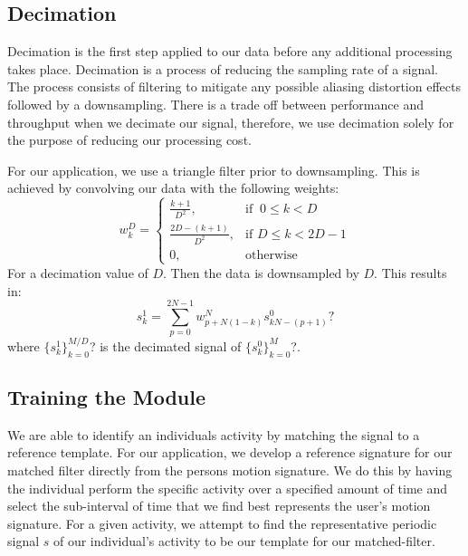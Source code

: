 \documentclass[journal]{IEEEtran}
\begin{document}
\subsection{Decimation}
Decimation is the first step applied to our data before any additional processing takes place.
Decimation is a process of reducing the sampling rate of a signal.
The process consists of filtering to mitigate any possible aliasing distortion effects followed by a downsampling.
There is a trade off between performance and throughput when we decimate our signal, therefore, we use decimation solely for the purpose of reducing our processing cost.

For our application, we use a triangle filter prior to downsampling. This is achieved by convolving our data with the following weights:
%
\begin{equation} \label{triangle_filter_weights}
w_k^D =
\begin{cases}
  \frac{k+1}{D^2}, & \text{if }\ 0 \leq k < D \\
  \frac{2D - (k + 1)}{D^2}, & \text{if } D \leq k < 2D - 1 \\
  0, & \text{otherwise}
\end{cases}
\end{equation}
%
For a decimation value of $D$. Then the data is downsampled by $D$. This results in:
%
\begin{equation} \label{decimated_signal}
s_k^1 = \sum_{p=0}^{2N-1} w_{p+N(1-k)}^N s_{kN - (p+1)}^0 ?
\end{equation}
%
where $\{s_k^1\}_{k=0}^{M/D}$? is the decimated signal of $\{s_k^0\}_{k=0}^M$?.
\subsection{Training the Module}
We are able to identify an individual\textquotesingle s activity by matching the signal to a reference template.
For our application, we develop a reference signature for our matched filter directly from the person\textquotesingle s motion signature.
We do this by having the individual perform the specific activity over a specified amount of time and select the sub-interval of time that we find best represents the user's motion signature.
For a given activity, we attempt to find the representative periodic signal $s$ of our individual’s activity to be our template for our matched-filter.
\end{document}
